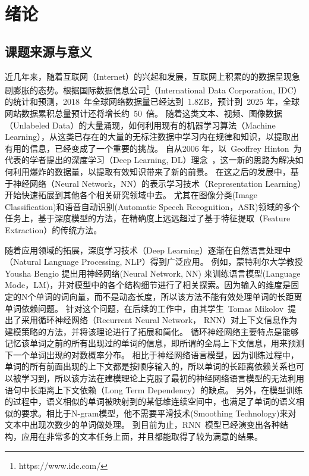 \chapter{绪论}
\section{课题来源与意义}
近几年来，随着互联网（Internet）的兴起和发展，互联网上积累的的数据呈现急剧膨胀的态势。根据国际数据信息公司\footnote{https://www.idc.com/}（International Data Corporation, IDC）的统计和预测，2018~年全球网络数据量已经达到~1.8ZB，预计到~2025 年，全球网站数据累积总量预计还将增长约~50~倍。
随着这类文本、视频、图像数据（Unlabeled Data）的大量涌现，如何利用现有的机器学习算法（Machine Learning），从这类已存在的大量的无标注数据中学习内在规律和知识，以提取出有用的信息，已经变成了一个重要的挑战。
自从2006 年，以~Geoffrey Hinton~为代表的学者提出的深度学习（Deep Learning, DL）理念~，这一新的思路为解决如何利用爆炸的数据量，以提取有效知识带来了新的前景。
在这之后的发展中，基于神经网络（Neural Network，NN）的表示学习技术（Representation Learning）开始快速拓展到其他各个相关研究领域中去。
尤其在图像分类(Image Classification)和语音自动识别(Automatic Speech Recognition，ASR)领域的多个任务上，基于深度模型的方法，在精确度上远远超过了基于特征提取（Feature Extraction）的传统方法。

随着应用领域的拓展，深度学习技术（Deep Learning）逐渐在自然语言处理中（Natural Language Processing, NLP）得到广泛应用。 例如，蒙特利尔大学教授 Yousha Bengio 提出用神经网络(Neural Network, NN) 来训练语言模型(Language Mode，LM)，并对模型中的各个结构细节进行了相关探索。因为输入的维度是固定的N个单词的词向量，而不是动态长度，所以该方法不能有效处理单词的长距离单词依赖问题。
针对这个问题，在后续的工作中，由其学生~Tomas Mikolov~提出了采用循环神经网络（Recurrent Neural Network， RNN）对上下文信息作为建模策略的方法，并将该理论进行了拓展和简化。
循环神经网络主要特点是能够记忆该单词之前的所有出现过的单词的信息，即所谓的全局上下文信息，用来预测下一个单词出现的对数概率分布。
相比于神经网络语言模型，因为训练过程中，单词的所有前面出现的上下文都是按顺序输入的，所以单词的长距离依赖关系也可以被学习到，所以该方法在建模理论上克服了最初的神经网络语言模型的无法利用语句中长距离上下文依赖（Long Term Dependency）的缺点。
另外，在模型训练的过程中，语义相似的单词被映射到的某低维连续空间中，也满足了单词的语义相似的要求。相比于N-gram模型，他不需要平滑技术(Smoothing Technology)来对文本中出现次数少的单词做处理。
到目前为止，RNN~模型已经演变出各种结构，应用在非常多的文本任务上面，并且都能取得了较为满意的结果。

